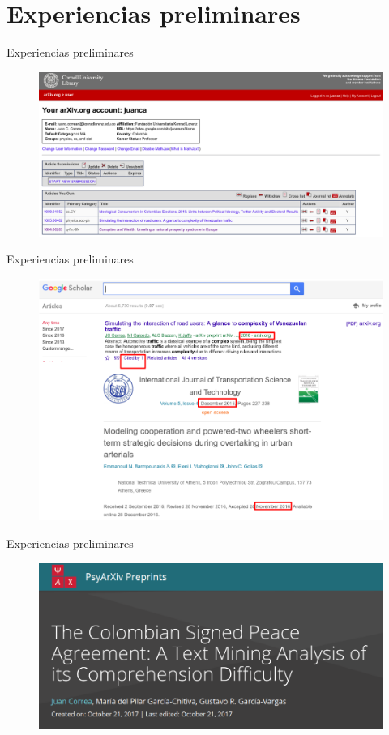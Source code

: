 \documentclass{beamer}
\begin{document}
\section{Experiencias preliminares}
\begin{frame}{Experiencias preliminares}
\begin{figure}
\centering
 \includegraphics[width=1\textwidth]{myarxiv}
\end{figure}
\end{frame}

\begin{frame}{Experiencias preliminares}
\begin{figure}
\centering
 \includegraphics[width=.7\textwidth]{cita2}
\end{figure}
\end{frame}


\begin{frame}{Experiencias preliminares}
\Large
\begin{figure}
\centering
 \includegraphics[width=.9\textwidth]{ejemplo}
\end{figure}
\end{frame}
\end{document}
